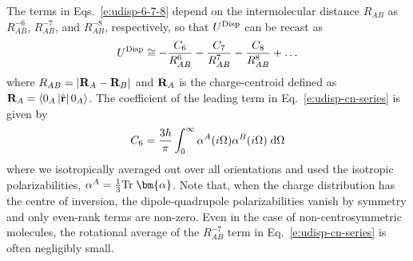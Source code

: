 \documentclass[a4paper,titlepage,twoside,fleqn,12pt]{book}
\newcommand{\BM}[1]{\bm{#1}}
\begin{document}
\begin{refsection}
%
The terms in Eqs.~\eqref{e:udisp-6-7-8} depend on the intermolecular distance 
$R_{AB}$ as $R^{-6}_{AB}$, $R^{-7}_{AB}$, and $R^{-8}_{AB}$, 
respectively, so that $U^{\rm Disp}$ can be recast as
%
\begin{equation} \label{e:udisp-cn-series}
 U^{\rm Disp} \cong -\frac{C_6}{R^{6}_{AB}} -\frac{C_7}{R^{7}_{AB}} -\frac{C_8}{R^{8}_{AB}} + \ldots
\end{equation}
%
where $R_{AB}=\left|{\bf R}_A-{\bf R}_B\right|$ 
and ${\bf R}_A$ is the charge\hyp{}centroid 
defined as ${\bf R}_A=\langle 0_A\left|\hat{\bf r}\right|0_A\rangle$. 
The coefficient of the leading term in Eq.~\eqref{e:udisp-cn-series} is given by
%
\begin{equation} \label{e:c6}
 C_6 = \frac{3\hbar}{\pi} \int_0^\infty \alpha^A(i\Omega) \alpha^B(i\Omega) \;{\rm d}\Omega
\end{equation}
%
where we isotropically averaged out over all orientations and used the 
isotropic polarizabilities, $\alpha^A=\frac{1}{3}{\rm Tr}\;{\BM \alpha}$.
Note that, when the charge distribution has the centre of inversion, 
the dipole\hyp{}quadrupole polarizabilities vanish by symmetry 
and only even\hyp{}rank terms are non\hyp{}zero. Even in the case 
of non\hyp{}centrosymmetric molecules, the rotational average 
of the $R^{-7}_{AB}$ term in Eq.~\eqref{e:udisp-cn-series} 
is often negligibly small. \citep{Stone.TheTheoryOfIntermolecularForces.1996}


\end{refsection}
\end{document}
